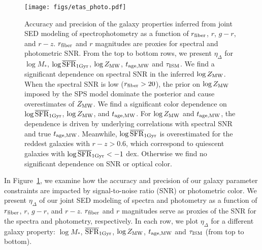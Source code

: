 \begin{figure}
\begin{center}
    \texttt{[image: figs/etas\_photo.pdf]}
    \caption{
        Accuracy and precision of the galaxy properties inferred from joint SED
        modeling of spectrophotometry as a function of $r_{\rm fiber}$, $r$,
        $g-r$, and $r-z$.
        $r_{\rm fiber}$ and $r$ magnitudes are proxies for spectral and
        photometric SNR. 
        From the top to bottom rows, we present $\eta_\Delta$ for $\log M_*$,
        $\log\overline{\rm SFR}_{\rm 1Gyr}$, $\log Z_{\rm MW}$, $t_{\rm age, MW}$ and 
        $\tau_{\rm ISM}$.
        We find a significant dependence on spectral SNR in the inferred 
        $\log Z_{\rm MW}$. 
        When the spectral SNR is low ($r_{\rm fiber} > 20$), the prior on 
        $\log Z_{\rm MW}$ imposed by the SPS model dominate the posterior and
        cause overestimates of $Z_{\rm MW}$. 
        We find a significant color dependence on $\log\overline{\rm SFR}_{\rm 1Gyr}$, $\log Z_{\rm
        MW}$, and $t_{\rm age, MW}$. 
        For $\log Z_{\rm MW}$ and $t_{\rm age, MW}$, the dependence is driven by underlying
        correlations with spectral SNR and true $t_{\rm age, MW}$. 
        Meanwhile, $\log\overline{\rm SFR}_{\rm 1Gyr}$ is overestimated for the reddest galaxies with
        $r - z > 0.6$, which correspond to quiescent galaxies with $\log\overline{\rm SFR}_{\rm 1Gyr}
        < -1$ dex. 
        Otherwise we find no significant dependence on SNR or optical color. 
    }    
    \label{fig:eta_photo}
\end{center}
\end{figure}

In Figure~\ref{fig:eta_photo}, we examine how the accuracy and precision of
our galaxy parameter constraints are impacted by signal-to-noise ratio (SNR) or
photometric color. 
We present $\eta_\Delta$ of our joint SED modeling of spectra and photometry as
a function of $r_{\rm fiber}$, $r$, $g-r$, and $r-z$. 
$r_{\rm fiber}$ and $r$ magnitudes serve as proxies of the SNR for the spectra
and photometry, respectively. 
In each row, we plot $\eta_\Delta$ for a different galaxy property: $\log M_*$,
$\overline{\rm SFR}_{\rm 1Gyr}$, $\log Z_{\rm MW}$, $t_{\rm age, MW}$ and $\tau_{\rm ISM}$ (from top to bottom).

